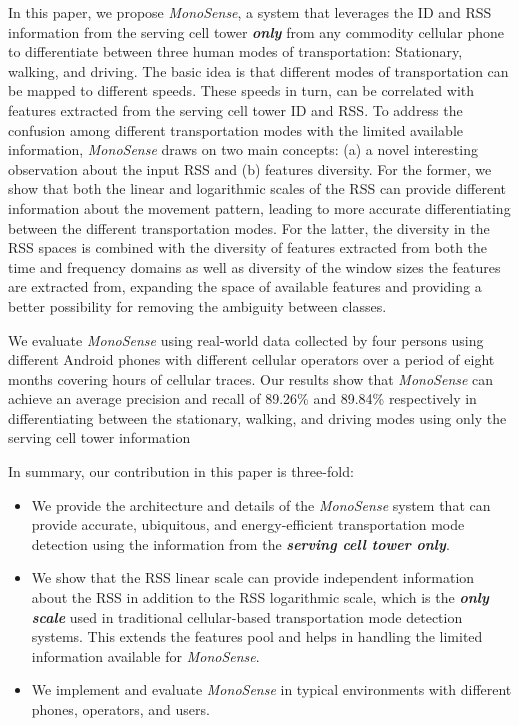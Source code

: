 \documentclass[conference]{IEEEtran}
\def \sys {\textit{MonoSense}}
\begin{document}
In this paper, we propose \sys{}, a system that leverages the ID and RSS information from the serving cell tower \textbf{\emph{only}} from any commodity cellular phone to differentiate between three human modes of transportation: Stationary, walking, and driving. The basic idea is that different modes of transportation can be mapped to different speeds. These speeds in turn, can be correlated with features extracted from the serving cell tower ID and RSS. To address the confusion among different transportation modes with the limited available information, \sys{} draws on two main concepts: (a) a novel interesting observation about the input RSS and (b) features diversity. For the former, we show that both the linear and logarithmic scales of the RSS can provide different information about the movement pattern, leading to more accurate differentiating between the different transportation modes. For the latter, the diversity in the RSS spaces is combined with the diversity of features extracted from both the time and frequency domains as well as diversity of the window sizes the features are extracted from, expanding the space of available features and providing a better possibility for removing the ambiguity between classes.





We evaluate \sys{} using real-world data collected by four persons using different Android phones  with different cellular  operators over a period of eight months covering  hours of cellular traces. Our results show that \sys{} can achieve an average precision and recall of 89.26\% and 89.84\% respectively in differentiating between the stationary, walking, and driving modes using only the serving cell tower information

In summary, our contribution in this paper is three-fold:
\begin{itemize}
  \item We provide the architecture and details of the \sys{} system that can provide accurate, ubiquitous, and energy-efficient transportation mode detection using the information from the \textbf{\emph{serving cell tower only}}.
  \item We show that the RSS linear scale can provide independent information about the RSS in addition to the RSS logarithmic scale, which is the \textbf{\emph{only scale}} used in traditional cellular-based transportation mode detection systems. This extends the features pool and helps in handling the limited information available for \sys{}.
  \item We implement and evaluate \sys{} in typical environments with different phones, operators, and users.
\end{itemize}
\end{document}

